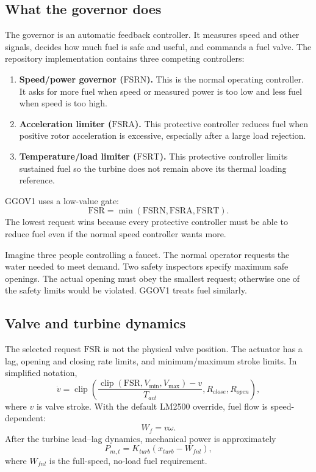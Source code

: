 \documentclass[11pt]{article}
\newcommand{\fsrn}{\ensuremath{\mathrm{FSRN}}}
\newcommand{\fsra}{\ensuremath{\mathrm{FSRA}}}
\newcommand{\fsrt}{\ensuremath{\mathrm{FSRT}}}
\newcommand{\fsr}{\ensuremath{\mathrm{FSR}}}
\begin{document}
\subsection{What the governor does}
The governor is an automatic feedback controller.  It measures speed and
other signals, decides how much fuel is safe and useful, and commands a fuel
valve.  The repository implementation contains three competing controllers:
\begin{enumerate}
  \item \textbf{Speed/power governor (\fsrn).}  This is the normal operating
        controller.  It asks for more fuel when speed or measured power is too
        low and less fuel when speed is too high.
  \item \textbf{Acceleration limiter (\fsra).}  This protective controller
        reduces fuel when positive rotor acceleration is excessive, especially
        after a large load rejection.
  \item \textbf{Temperature/load limiter (\fsrt).}  This protective
        controller limits sustained fuel so the turbine does not remain above
        its thermal loading reference.
\end{enumerate}
GGOV1 uses a low-value gate:
\begin{equation}
  \fsr=\min(\fsrn,\fsra,\fsrt).
  \label{eq:lvg}
\end{equation}
The lowest request wins because every protective controller must be able to
reduce fuel even if the normal speed controller wants more.

\begin{novicebox}
Imagine three people controlling a faucet.  The normal operator requests the
water needed to meet demand.  Two safety inspectors specify maximum safe
openings.  The actual opening must obey the smallest request; otherwise one of
the safety limits would be violated.  GGOV1 treats fuel similarly.
\end{novicebox}

\subsection{Valve and turbine dynamics}
The selected request $\fsr$ is not the physical valve position.  The actuator
has a lag, opening and closing rate limits, and minimum/maximum stroke limits.
In simplified notation,
\begin{equation}
  \dot v = \operatorname{clip}\!\left(
    \frac{\operatorname{clip}(\fsr,V_{\min},V_{\max})-v}{T_{act}},
    R_{close},R_{open}\right),
  \label{eq:valve}
\end{equation}
where $v$ is valve stroke.  With the default LM2500 override, fuel flow is
speed-dependent:
\begin{equation}
  W_f=v\omega.
  \label{eq:fuel}
\end{equation}
After the turbine lead--lag dynamics, mechanical power is approximately
\begin{equation}
  P_{m,t}=K_{turb}(x_{turb}-W_{fnl}),
  \label{eq:turbine}
\end{equation}
where $W_{fnl}$ is the full-speed, no-load fuel requirement.
\end{document}
